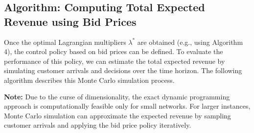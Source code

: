 \documentclass[11pt]{article}
\begin{document}
\vspace{0.5cm}




\subsection{Algorithm: Computing Total Expected Revenue using Bid Prices}

\noindent
Once the optimal Lagrangian multipliers $\lambda^*$ are obtained (e.g., using Algorithm 4), the control policy based on bid prices can be defined. To evaluate the performance of this policy, we can estimate the total expected revenue by simulating customer arrivals and decisions over the time horizon. The following algorithm describes this Monte Carlo simulation process.

\vspace{0.5cm}

\noindent
\textbf{Note:} Due to the curse of dimensionality, the exact dynamic programming approach is computationally feasible only for small networks. For larger instances, Monte Carlo simulation can approximate the expected revenue by sampling customer arrivals and applying the bid price policy iteratively.

\vspace{0.5cm}
\end{document}
